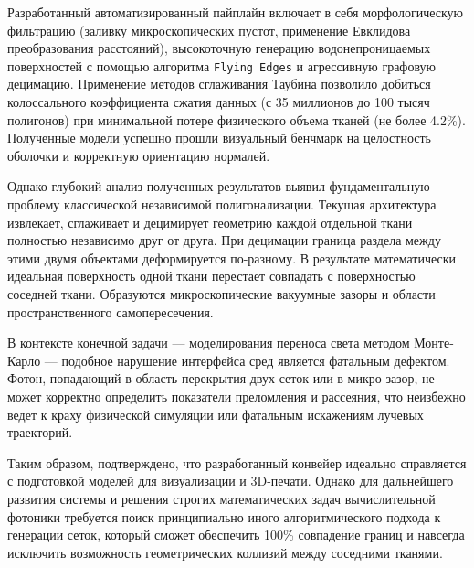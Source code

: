 \documentclass[a4paper,14pt]{article}
\begin{document}
Разработанный автоматизированный пайплайн включает в себя морфологическую фильтрацию (заливку микроскопических пустот, применение Евклидова преобразования расстояний), высокоточную генерацию водонепроницаемых поверхностей с помощью алгоритма \texttt{Flying Edges} и агрессивную графовую децимацию. Применение методов сглаживания Таубина позволило добиться колоссального коэффициента сжатия данных (с 35 миллионов до 100 тысяч полигонов) при минимальной потере физического объема тканей (не более 4.2\%). Полученные модели успешно прошли визуальный бенчмарк на целостность оболочки и корректную ориентацию нормалей. 

Однако глубокий анализ полученных результатов выявил фундаментальную проблему классической независимой полигонализации. Текущая архитектура извлекает, сглаживает и децимирует геометрию каждой отдельной ткани полностью независимо друг от друга. При децимации граница раздела между этими двумя объектами деформируется по-разному. В результате математически идеальная поверхность одной ткани перестает совпадать с поверхностью соседней ткани. Образуются микроскопические вакуумные зазоры и области пространственного самопересечения.

В контексте конечной задачи — моделирования переноса света методом Монте-Карло — подобное нарушение интерфейса сред является фатальным дефектом. Фотон, попадающий в область перекрытия двух сеток или в микро-зазор, не может корректно определить показатели преломления и рассеяния, что неизбежно ведет к краху физической симуляции или фатальным искажениям лучевых траекторий.

Таким образом, подтверждено, что разработанный конвейер идеально справляется с подготовкой моделей для визуализации и 3D-печати. Однако для дальнейшего развития системы и решения строгих математических задач вычислительной фотоники требуется поиск принципиально иного алгоритмического подхода к генерации сеток, который сможет обеспечить 100\% совпадение границ и навсегда исключить возможность геометрических коллизий между соседними тканями.
\end{document}
